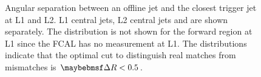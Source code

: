 \begin{figure}[htpb]
{    \label{fig:dijets:dR_L2j24_29}}
  \quad
  \caption{Angular separation \DeltaR between an offline jet and the closest trigger jet at L1 and L2. \protect{} L1 central jets, \protect{} L2 central jets and \protect{} are shown separately. The distribution is not shown for the forward region at L1 since the FCAL has no \pseudorap measurement at L1. The distributions indicate that the optimal \DeltaR cut to distinguish real matches from mismatches is $\DeltaR < 0.5$.}
  \label{fig:dijets:DeltaR}
\end{figure}

